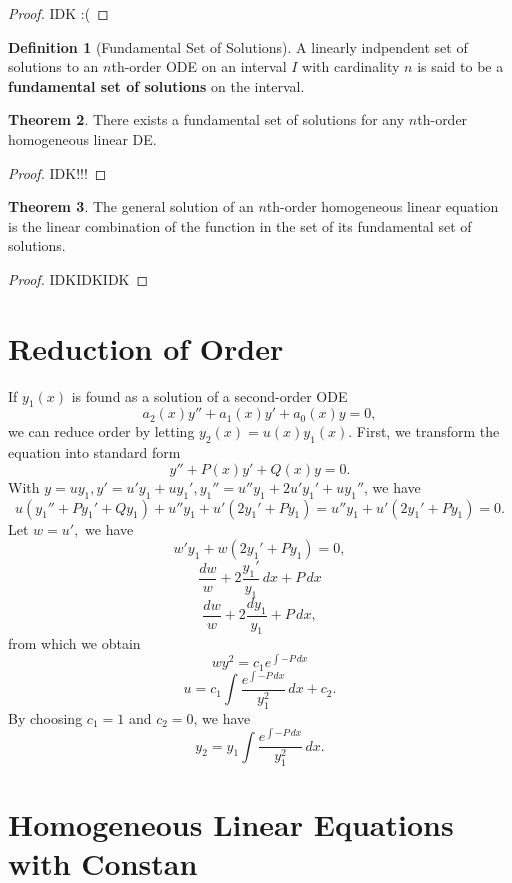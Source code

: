 \documentclass[12pt,a4paper]{report}
\theoremstyle{definition}
\newtheorem{theorem}{Theorem}[section]
\newtheorem{definition}[theorem]{Definition}
\theoremstyle{remark}
\begin{document}
\begin{proof}
    IDK :(
\end{proof}

\begin{definition}[Fundamental Set of Solutions]
    A linearly indpendent set of solutions to an $n$th-order ODE on an interval $I$ with cardinality $n$ is said to be a \textbf{fundamental set of solutions} on the interval. 
\end{definition}

\begin{theorem}
    There exists a fundamental set of solutions for any $n$th-order homogeneous linear DE.
\end{theorem}
\begin{proof}
    IDK!!!
\end{proof}

\begin{theorem}
    The general solution of an $n$th-order homogeneous linear equation is the linear combination of the function in the set of its fundamental set of solutions.
\end{theorem}
\begin{proof}
    IDKIDKIDK
\end{proof}

\section{Reduction of Order}

If $y_1(x)$ is found as a solution of a second-order ODE 
\[a_2(x)y'' + a_1(x)y' + a_0(x)y = 0,\]
we can reduce order by letting $y_2(x) = u(x)y_1(x).$ First, we transform the equation into standard form
\[y'' + P(x)y' + Q(x)y = 0.\]
With $y = uy_1, y' = u'y_1 + uy_1', y_1'' = u''y_1 + 2u'y_1' + uy_1''$, we have
\[u(y_1'' + Py_1' + Qy_1) + u''y_1 + u'(2y_1' + Py_1) = u''y_1 + u'(2y_1' + Py_1) = 0.\]
Let $w = u',$ we have 
\[w'y_1 + w(2y_1' + Py_1) = 0,\]
\[\frac{dw}{w} + 2\frac{y_1'}{y_1}\, dx + P \, dx\]
\[\frac{dw}{w} + 2\frac{dy_1}{y_1} + P \, dx,\]
from which we obtain
\[wy^2 = c_1e^{\int - P \, dx}\]
\[u = c_1\int\frac{e^{\int -P \, dx}}{y_1^2} \, dx + c_2.\]
By choosing $c_1 = 1$ and $c_2 = 0$, we have 
\[y_2 = y_1 \int \frac{e^{\int -P \, dx}}{y_1^2} \, dx.\]

\section{Homogeneous Linear Equations with Constan}
\end{document}
